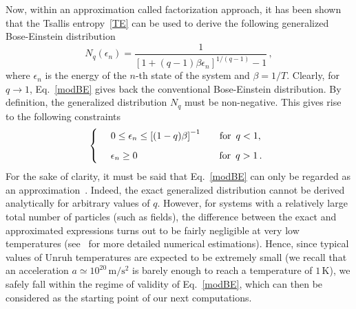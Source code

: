 \documentclass[floats,prd,aps,amssymb,nofootinbib,showkeys]{revtex4}
\newcommand{\be}{\begin{equation}}\newcommand{\ee}{\end{equation}}
\begin{document}
Now, within an approximation called factorization approach, 
it has been shown that the Tsallis entropy~\eqref{TE}
can be used to derive the following generalized Bose-Einstein 
distribution~\cite{Buyu,Buyu2,Buyu3,Buyu4,Chen}
\be
\label{modBE}
N_q(\epsilon_n)=\frac{1}{\left[1+(q-1)\beta \epsilon_n\right]^{1/(q-1)}-1}\,,
\ee
where $\epsilon_n$ is the energy of the
$n$-th state of the system and $\beta=1/T$. 
Clearly, for $q\rightarrow1$, Eq.~\eqref{modBE}
gives back the conventional Bose-Einstein distribution. %
By definition, the generalized distribution $N_q$
must be non-negative. This gives rise to the
following constraints
\be
\label{constraint}
\left\{\begin{array}{rcl}
&&\hspace{-4mm}0\le\epsilon_n\le \left[(1-q)\beta\right]^{-1}\,\,\,\,\,\,\,\,\,\ \mathrm{for}\,\,\, q<1,\\[3mm]
&&\hspace{-4mm}\epsilon_n\ge0\hspace{3cm}\mathrm{for}\,\,\, q>1\,.
\end{array}
\right.
\ee
For the sake of clarity, it must be said that
Eq.~\eqref{modBE} can only be regarded as an approximation~\cite{AppBE}. Indeed, 
the exact generalized distribution cannot be derived analytically for arbitrary values of $q$. However, for systems with a relatively large total number of particles (such as fields), the difference between the exact and approximated expressions
turns out to be fairly negligible at very low temperatures (see~\cite{AppBE} for more detailed numerical estimations). Hence, since typical values
of Unruh temperatures are expected to be extremely small
(we recall that an acceleration $a\simeq10^{20}\,\mathrm{m/s^2}$ 
is barely enough to reach a temperature of $1\,{\mathrm{K}}$), 
we safely fall within the regime of validity of Eq.~\eqref{modBE}, which can then be considered as the starting point of our next computations. 
\end{document}
